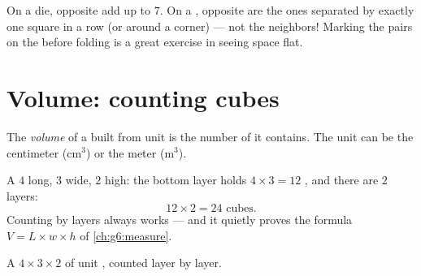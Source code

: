 \begin{example}\label{ex:g5:solids:read}
On a die, opposite  add up to $7$. On a , opposite  are
the ones separated by exactly one square in a row (or around a
corner) --- not the neighbors! Marking the pairs on the  before
folding is a great exercise in seeing space flat.
\end{example}

\section{Volume: counting cubes}

\begin{definition}\label{def:g5:solids:volume}
The \emph{volume} of a  built from unit  is
the number of  it contains. The unit can be the centimeter 
(cm$^3$) or the meter  (m$^3$).
\end{definition}

\begin{example}\label{ex:g5:solids:layers}
A  $4$  long, $3$ wide, $2$ high: the bottom layer holds
$4 \times 3 = 12$ , and there are $2$ layers:
\[
12 \times 2 = 24 \text{ cubes} .
\]
Counting by layers always works --- and it quietly proves the
formula $V = L \times w \times h$ of \cref{ch:g6:measure}.
\end{example}

\begin{omfigure}

{\small A $4 \times 3 \times 2$  of unit , counted layer by
layer.}
\end{omfigure}

